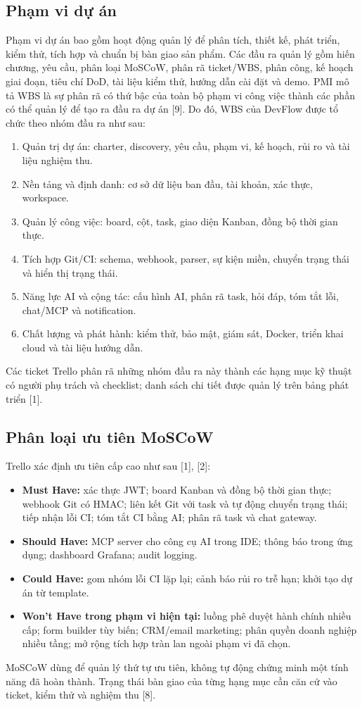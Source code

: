 \documentclass[12pt,a4paper]{report}
\begin{document}
\subsection{Phạm vi dự án}
Phạm vi dự án bao gồm hoạt động quản lý để phân tích, thiết kế, phát triển, kiểm thử, tích hợp và chuẩn bị bàn giao sản phẩm. Các đầu ra quản lý gồm hiến chương, yêu cầu, phân loại MoSCoW, phân rã ticket/WBS, phân công, kế hoạch giai đoạn, tiêu chí DoD, tài liệu kiểm thử, hướng dẫn cài đặt và demo. PMI mô tả WBS là sự phân rã có thứ bậc của toàn bộ phạm vi công việc thành các phần có thể quản lý để tạo ra đầu ra dự án [9]. Do đó, WBS của DevFlow được tổ chức theo nhóm đầu ra như sau:

\begin{enumerate}
    \item Quản trị dự án: charter, discovery, yêu cầu, phạm vi, kế hoạch, rủi ro và tài liệu nghiệm thu.
    \item Nền tảng và định danh: cơ sở dữ liệu ban đầu, tài khoản, xác thực, workspace.
    \item Quản lý công việc: board, cột, task, giao diện Kanban, đồng bộ thời gian thực.
    \item Tích hợp Git/CI: schema, webhook, parser, sự kiện miền, chuyển trạng thái và hiển thị trạng thái.
    \item Năng lực AI và cộng tác: cấu hình AI, phân rã task, hỏi đáp, tóm tắt lỗi, chat/MCP và notification.
    \item Chất lượng và phát hành: kiểm thử, bảo mật, giám sát, Docker, triển khai cloud và tài liệu hướng dẫn.
\end{enumerate}
Các ticket Trello phân rã những nhóm đầu ra này thành các hạng mục kỹ thuật có người phụ trách và checklist; danh sách chi tiết được quản lý trên bảng phát triển [1].

\subsection{Phân loại ưu tiên MoSCoW}
Trello xác định ưu tiên cấp cao như sau [1], [2]:
\begin{itemize}
    \item \textbf{Must Have:} xác thực JWT; board Kanban và đồng bộ thời gian thực; webhook Git có HMAC; liên kết Git với task và tự động chuyển trạng thái; tiếp nhận lỗi CI; tóm tắt CI bằng AI; phân rã task và chat gateway.
    \item \textbf{Should Have:} MCP server cho công cụ AI trong IDE; thông báo trong ứng dụng; dashboard Grafana; audit logging.
    \item \textbf{Could Have:} gom nhóm lỗi CI lặp lại; cảnh báo rủi ro trễ hạn; khởi tạo dự án từ template.
    \item \textbf{Won't Have trong phạm vi hiện tại:} luồng phê duyệt hành chính nhiều cấp; form builder tùy biến; CRM/email marketing; phân quyền doanh nghiệp nhiều tầng; mở rộng tích hợp tràn lan ngoài phạm vi đã chọn.
\end{itemize}
MoSCoW dùng để quản lý thứ tự ưu tiên, không tự động chứng minh một tính năng đã hoàn thành. Trạng thái bàn giao của từng hạng mục cần căn cứ vào ticket, kiểm thử và nghiệm thu [8].
\end{document}
